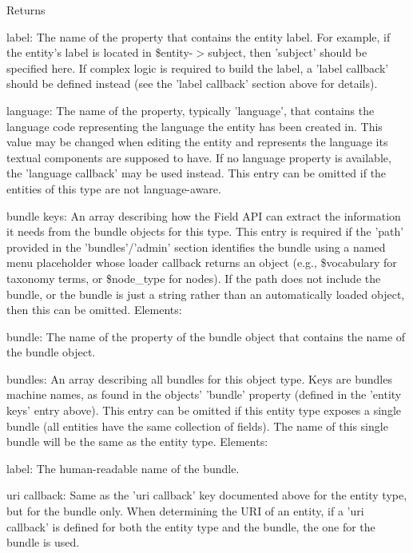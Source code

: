 \begin{DoxyReturn}{Returns}
\begin{DoxyItemize}
\begin{DoxyItemize}
\item label: The name of the property that contains the entity label. For example, if the entity's label is located in \$entity-\/$>$subject, then 'subject' should be specified here. If complex logic is required to build the label, a 'label callback' should be defined instead (see the 'label callback' section above for details).
\item language: The name of the property, typically 'language', that contains the language code representing the language the entity has been created in. This value may be changed when editing the entity and represents the language its textual components are supposed to have. If no language property is available, the 'language callback' may be used instead. This entry can be omitted if the entities of this type are not language-\/aware.
\end{DoxyItemize}
\item bundle keys: An array describing how the Field API can extract the information it needs from the bundle objects for this type. This entry is required if the 'path' provided in the 'bundles'/'admin' section identifies the bundle using a named menu placeholder whose loader callback returns an object (e.g., \$vocabulary for taxonomy terms, or \$node\_\-type for nodes). If the path does not include the bundle, or the bundle is just a string rather than an automatically loaded object, then this can be omitted. Elements:
\begin{DoxyItemize}
\item bundle: The name of the property of the bundle object that contains the name of the bundle object.
\end{DoxyItemize}
\item bundles: An array describing all bundles for this object type. Keys are bundles machine names, as found in the objects' 'bundle' property (defined in the 'entity keys' entry above). This entry can be omitted if this entity type exposes a single bundle (all entities have the same collection of fields). The name of this single bundle will be the same as the entity type. Elements:
\begin{DoxyItemize}
\item label: The human-\/readable name of the bundle.
\item uri callback: Same as the 'uri callback' key documented above for the entity type, but for the bundle only. When determining the URI of an entity, if a 'uri callback' is defined for both the entity type and the bundle, the one for the bundle is used.

\end{DoxyItemize}
\end{DoxyItemize}
\end{DoxyReturn}
